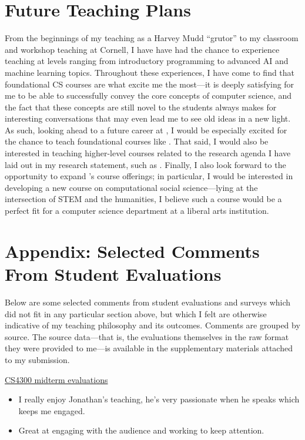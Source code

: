 \documentclass[12pt,letterpaper]{article}
\begin{document}
\section{Future Teaching Plans}
From the beginnings of my teaching as a Harvey Mudd ``grutor'' to my classroom and workshop teaching at Cornell, I have have had the chance to experience teaching at levels ranging from introductory programming to advanced AI and machine learning topics.
Throughout these experiences, I have come to find that foundational CS courses are what excite me the most---it is deeply satisfying for me to be able to successfully convey the core concepts of computer science, and the fact that these concepts are still novel to the students always makes for interesting conversations that may even lead me to see old ideas in a new light.
As such, looking ahead to a future career at \schoolname, I would be especially excited for the chance to teach foundational courses like \schoolintrocourses.
That said, I would also be interested in teaching higher-level courses related to the research agenda I have laid out in my research statement, such as \schooladvcourses.
Finally, I also look forward to the opportunity to expand \schoolname's course offerings; in particular, I would be interested in developing a new course on computational social science---lying at the intersection of STEM and the humanities, I believe such a course would be a perfect fit for a computer science department at a liberal arts institution.


\ifappendix
\vspace{\baselineskip}
\section{Appendix: Selected Comments From Student Evaluations}
Below are some selected comments from student evaluations and surveys which did not fit in any particular section above, but which I felt are otherwise indicative of my teaching philosophy and its outcomes.
Comments are grouped by source.
The source data---that is, the evaluations themselves in the raw format they were provided to me---is available in the supplementary materials attached to my submission.


\noindent\underline{CS4300 midterm evaluations}
\begin{itemize}
    \item I really enjoy Jonathan's teaching, he's very passionate when he speaks which keeps me engaged.
    \item Great at engaging with the audience and working to keep attention.
\end{itemize}
\end{document}
